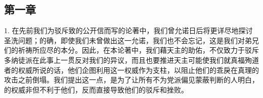 \par


\subsection{第一章}

1. 在先前我们为驳斥致的公开信而写的论著中，我们曾允诺日后将更详尽地探讨圣洗问题；的确，即使我们未曾做出这一允诺，我们也不会忘记，这是我们对弟兄们的祈祷所应尽的本分。因此，在本论著中，我们藉天主的助佑，不仅致力于驳斥多纳徒派在此事上一贯反对我们的异议，而且也要推进天主可能使我们就真福殉道者的权威所说的话，他们企图利用这一权威作为支柱，以阻止他们的乖戾在真理的攻击之前倒塌。我们提出这一点，是为了让所有不为党派偏见蒙蔽判断的人明白，的权威非但不利于他们，反而直接导致他们的驳斥和挫败。\par

